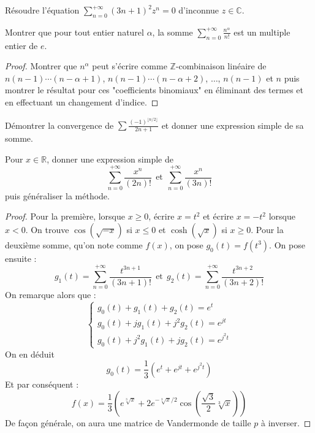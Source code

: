 \documentclass[french,a4paper]{article}
\newcommand{\Z}{\mathbb{Z}}
\newcommand{\R}{\mathbb{R}}
\newcommand{\C}{\mathbb{C}}
\theoremstyle{plain}
\theoremstyle{definition}
\theoremstyle{remark}
\begin{document}
\begin{ex}[Moulin.SE.25]{}
	Résoudre l'équation $\displaystyle\sum_{n=0}^{+\infty}(3n+1)^2z^n=0$ d'inconnue $z\in\C$.
\end{ex}

\begin{ex}[Moulin.SE.26]{}
	Montrer que pour tout entier naturel $\alpha$, la somme $\displaystyle\sum_{n=0}^{+\infty}\frac{n^\alpha}{n!}$ est un multiple entier de $e$.
\end{ex}
\begin{proof}
	Montrer que $n^\alpha$ peut s'écrire comme $\Z$-combinaison linéaire de $n(n-1)\cdots(n-\alpha+1)$, $n(n-1)\cdots(n-\alpha+2)$, $\ldots$, $n(n-1)$ et $n$ puis montrer le résultat pour ces "coefficients binomiaux" en éliminant des termes et en effectuant un changement d'indice.
\end{proof}

\begin{ex}[Moulin.SE.27]{}
	Démontrer la convergence de $\displaystyle\sum\frac{(-1)^{\lfloor n/2\rfloor}}{2n+1}$ et donner une expression simple de sa somme.
\end{ex}

\begin{ex}[Moulin.SE.28]{}
	Pour $x\in\R$, donner une expression simple de $$\sum_{n=0}^{+\infty}\frac{x^n}{(2n)!} \ \ \text{et}\ \ \sum_{n=0}^{+\infty}\frac{x^n}{(3n)!}$$ puis généraliser la méthode.
\end{ex}
\begin{proof}
	Pour la première, lorsque $x\geqslant0$, écrire $x=t^2$ et écrire $x=-t^2$ lorsque $x<0$. On trouve $\cos(\sqrt{-x})$ si $x\leqslant0$ et $\cosh(\sqrt{x})$ si $x\geqslant0$. Pour la deuxième somme, qu'on note comme $f(x)$, on pose $g_0(t)=f(t^3)$. On pose ensuite : $$g_1(t)=\sum_{n=0}^{+\infty}\frac{t^{3n+1}}{(3n+1)!} \ \ \text{et} \ \ g_2(t)=\sum_{n=0}^{+\infty}\frac{t^{3n+2}}{(3n+2)!}$$ On remarque alors que : $$\begin{cases}
		g_0(t)+g_1(t)+g_2(t)=e^t \\
		g_0(t)+jg_1(t)+j^2g_2(t)=e^{jt} \\
		g_0(t)+j^2g_1(t)+jg_2(t)=e^{j^2t}
	\end{cases}$$ On en déduit $$g_0(t)=\frac{1}{3}(e^{t}+e^{jt}+e^{j^2t})$$ Et par conséquent : $$f(x)=\frac{1}{3}\left(e^{\sqrt[3]{x}}+2e^{-\sqrt[3]{x}/2}\cos\left(\frac{\sqrt{3}}{2}\sqrt[3]{x}\right)\right)$$ De façon générale, on aura une matrice de Vandermonde de taille $p$ à inverser.
\end{proof}
\end{document}
